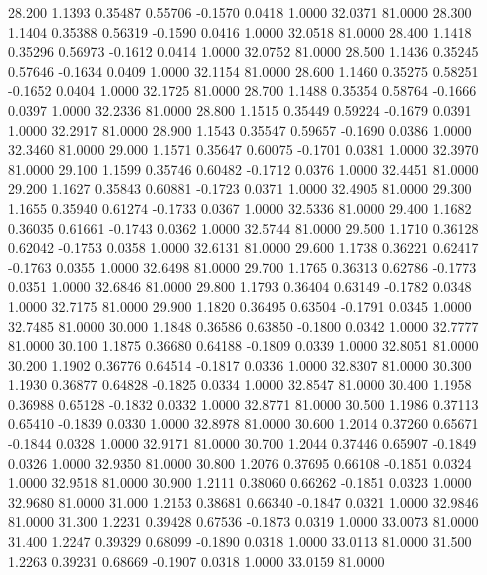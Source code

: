   28.200   1.1393   0.35487   0.55706  -0.1570   0.0418   1.0000  32.0371  81.0000
  28.300   1.1404   0.35388   0.56319  -0.1590   0.0416   1.0000  32.0518  81.0000
  28.400   1.1418   0.35296   0.56973  -0.1612   0.0414   1.0000  32.0752  81.0000
  28.500   1.1436   0.35245   0.57646  -0.1634   0.0409   1.0000  32.1154  81.0000
  28.600   1.1460   0.35275   0.58251  -0.1652   0.0404   1.0000  32.1725  81.0000
  28.700   1.1488   0.35354   0.58764  -0.1666   0.0397   1.0000  32.2336  81.0000
  28.800   1.1515   0.35449   0.59224  -0.1679   0.0391   1.0000  32.2917  81.0000
  28.900   1.1543   0.35547   0.59657  -0.1690   0.0386   1.0000  32.3460  81.0000
  29.000   1.1571   0.35647   0.60075  -0.1701   0.0381   1.0000  32.3970  81.0000
  29.100   1.1599   0.35746   0.60482  -0.1712   0.0376   1.0000  32.4451  81.0000
  29.200   1.1627   0.35843   0.60881  -0.1723   0.0371   1.0000  32.4905  81.0000
  29.300   1.1655   0.35940   0.61274  -0.1733   0.0367   1.0000  32.5336  81.0000
  29.400   1.1682   0.36035   0.61661  -0.1743   0.0362   1.0000  32.5744  81.0000
  29.500   1.1710   0.36128   0.62042  -0.1753   0.0358   1.0000  32.6131  81.0000
  29.600   1.1738   0.36221   0.62417  -0.1763   0.0355   1.0000  32.6498  81.0000
  29.700   1.1765   0.36313   0.62786  -0.1773   0.0351   1.0000  32.6846  81.0000
  29.800   1.1793   0.36404   0.63149  -0.1782   0.0348   1.0000  32.7175  81.0000
  29.900   1.1820   0.36495   0.63504  -0.1791   0.0345   1.0000  32.7485  81.0000
  30.000   1.1848   0.36586   0.63850  -0.1800   0.0342   1.0000  32.7777  81.0000
  30.100   1.1875   0.36680   0.64188  -0.1809   0.0339   1.0000  32.8051  81.0000
  30.200   1.1902   0.36776   0.64514  -0.1817   0.0336   1.0000  32.8307  81.0000
  30.300   1.1930   0.36877   0.64828  -0.1825   0.0334   1.0000  32.8547  81.0000
  30.400   1.1958   0.36988   0.65128  -0.1832   0.0332   1.0000  32.8771  81.0000
  30.500   1.1986   0.37113   0.65410  -0.1839   0.0330   1.0000  32.8978  81.0000
  30.600   1.2014   0.37260   0.65671  -0.1844   0.0328   1.0000  32.9171  81.0000
  30.700   1.2044   0.37446   0.65907  -0.1849   0.0326   1.0000  32.9350  81.0000
  30.800   1.2076   0.37695   0.66108  -0.1851   0.0324   1.0000  32.9518  81.0000
  30.900   1.2111   0.38060   0.66262  -0.1851   0.0323   1.0000  32.9680  81.0000
  31.000   1.2153   0.38681   0.66340  -0.1847   0.0321   1.0000  32.9846  81.0000
  31.300   1.2231   0.39428   0.67536  -0.1873   0.0319   1.0000  33.0073  81.0000
  31.400   1.2247   0.39329   0.68099  -0.1890   0.0318   1.0000  33.0113  81.0000
  31.500   1.2263   0.39231   0.68669  -0.1907   0.0318   1.0000  33.0159  81.0000
